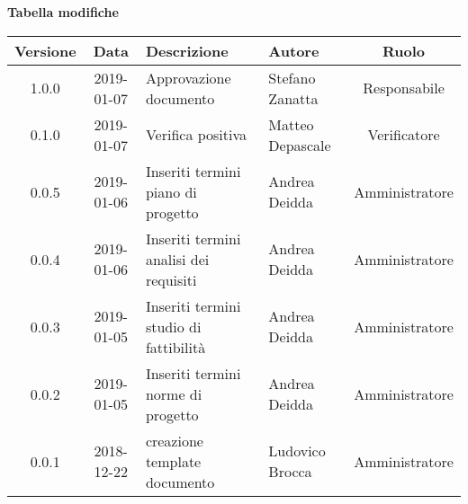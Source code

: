 \begin{center}
	\textbf{Tabella modifiche}
	\end{center}
	\begin{center}
		\begin{tabularx}{\textwidth}{|c|c|X|X|c|}
			\hline
			\textbf{Versione} & \textbf{Data} & \textbf{Descrizione} & \textbf{Autore} & \textbf{Ruolo} \\
			\hline
			1.0.0 & 2019-01-07 & Approvazione documento & Stefano Zanatta & Responsabile \\
			\hline
			0.1.0 & 2019-01-07 & Verifica positiva & Matteo Depascale & Verificatore \\
			\hline
			0.0.5 & 2019-01-06 & Inseriti termini piano di progetto & Andrea Deidda & Amministratore\\
			\hline
			0.0.4 & 2019-01-06 & Inseriti termini analisi dei requisiti & Andrea Deidda & Amministratore\\
			\hline
			0.0.3 & 2019-01-05 & Inseriti termini studio di fattibilità & Andrea Deidda & Amministratore\\
			\hline
			0.0.2 & 2019-01-05 & Inseriti termini norme di progetto & Andrea Deidda & Amministratore\\
			\hline
			0.0.1 & 2018-12-22 & creazione template documento & Ludovico Brocca & Amministratore\\
			\hline
		\end{tabularx}
	\end{center}
\newpage